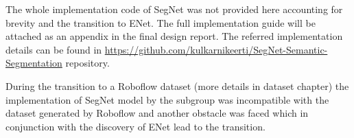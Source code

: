 The whole implementation code of SegNet was not provided here accounting for brevity and the transition to ENet. The full implementation guide will be attached as an appendix in the final design report. The referred implementation details can be found in \url{https://github.com/kulkarnikeerti/SegNet-Semantic-Segmentation} repository.

During the transition to a Roboflow dataset (more details in dataset chapter) the implementation of SegNet model by the subgroup was incompatible with the dataset generated by Roboflow and another obstacle was faced which in conjunction with the discovery of ENet lead to the transition.



